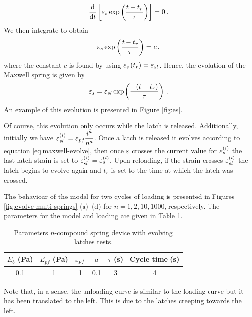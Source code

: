 \documentclass{article}
\begin{document}
\begin{equation}
	\dfrac{\text{d} }{\text{d} t}\left[\varepsilon_{s}\exp\left(\dfrac{t-t_{r}}{\tau}\right)\right] = 0\,.
\end{equation}
We then integrate to obtain
\begin{equation}
	\varepsilon_{s}\exp\left(\dfrac{t-t_{r}}{\tau}\right) = c\,,
\end{equation}
where the constant $c$ is found by using $\varepsilon_{s}\left(t_{r}\right)=\varepsilon_{sl}$. Hence, the evolution of the Maxwell spring is given by
\begin{equation}
	\varepsilon_{s} = \varepsilon_{sl}\exp\left(\dfrac{-(t-t_{r})}{\tau}\right)\,.
	\label{eq:maxwell-evolve}
\end{equation}
An example of this evolution is presented in Figure \ref{fig:es}.

Of course, this evolution only occurs while the latch is released. Additionally, initially we have $\varepsilon^{(i)}_{sl} = \varepsilon_{pf}\dfrac{i^{a}}{n^{a}}$. Once a latch is released it evolves according to equation \eqref{eq:maxwell-evolve}, then once $\varepsilon$ crosses the current value for $\varepsilon^{(i)}_{s}$ the last latch strain is set to $\varepsilon^{(i)}_{sl}=\varepsilon^{(i)}_{s}$. Upon reloading, if the strain crosses $\varepsilon^{(i)}_{sl}$ the latch begins to evolve again and $t_r$ is set to the time at which the latch was crossed. 

The behaviour of the model for two cycles of loading is presented in Figures \ref{fig:evolve-multi-springs} (a)--(d) for $n=1,2,10,1000$, respectively. The parameters for the model and loading are given in Table \ref{tab:multi-evolve-params}.
\begin{table}
	\centering
	\caption{Parameters $n$-compound spring device with evolving latches tests.}
	\label{tab:multi-evolve-params}
	\begin{tabular}{c| c| c | c | c | c}
		$E_b$ (Pa)& $E_{pf}$  (Pa)& $\varepsilon_{pf}$ & $a$  & $\tau$ (s) & Cycle time (s) \\
		\hline \hline
		0.1 & 1 & 1 & 0.1 & 3 & 4
	\end{tabular}
\end{table}
Note that, in a sense, the unloading curve is similar to the loading curve but it has been translated to the left. This is due to the latches creeping towards the left. 
\end{document}

